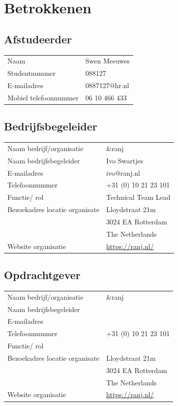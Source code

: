 \documentclass{report}
\makeatletter
\newcommand{\name}{Swen Meeuwes}
\newcommand{\studentnumber}{088127}
\newcommand{\email}{0887127@hr.nl}
\newcommand{\mobilephone}{06 10 466 433}
\newcommand{\organisation}{\&ranj }
\makeatother
\begin{document}




\chapter{Betrokkenen}

\section*{Afstudeerder}
\begin{table}[h]
\begin{tabular}{ll}
Naam & \name \\
Studentnummer & \studentnumber \\
E-mailadres & \email \\
Mobiel telefoonnummer & \mobilephone
\end{tabular}
\end{table}

\section*{Bedrijfsbegeleider}
\begin{table}[h]
\begin{tabular}{ll}
Naam bedrijf/organisatie & \organisation \\
Naam bedrijfsbegeleider & Ivo Swartjes \\
E-mailadres & ivo@ranj.nl \\
Telefoonnummer & +31 (0) 10 21 23 101 \\
Functie/ rol & Technical Team Lead \\
Bezoekadres locatie organisate & Lloydstraat 21m \\ 
 & 3024 EA Rotterdam \\
 & The Netherlands \\
Website organisatie & \url{https://ranj.nl/}
\end{tabular}
\end{table}

\section*{Opdrachtgever}
\begin{table}[h]
\begin{tabular}{ll}
Naam bedrijf/organisatie & \organisation \\
Naam bedrijfsbegeleider &  \\
E-mailadres &  \\
Telefoonnummer & +31 (0) 10 21 23 101 \\
Functie/ rol &  \\
Bezoekadres locatie organisate & Lloydstraat 21m \\ 
 & 3024 EA Rotterdam \\
 & The Netherlands \\
Website organisatie & \url{https://ranj.nl/}
\end{tabular}
\end{table}
\end{document}
